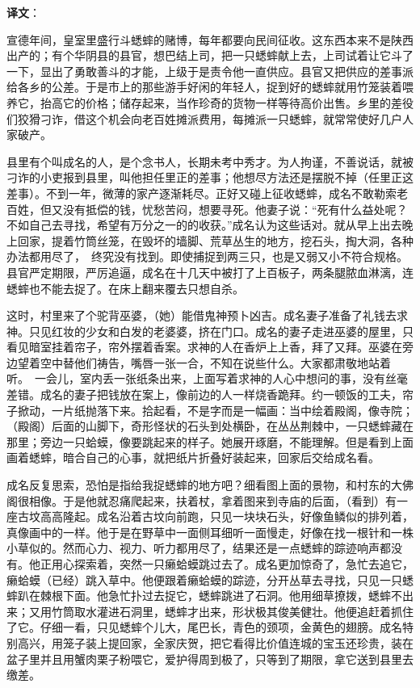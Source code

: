 \documentclass[12pt,UTF-8,openany]{ctexbook}
\begin{document}
\newpage

\textbf{译文}：

\vspace{1em}

\begin{normalsize}
    
    宣德年间，皇室里盛行斗蟋蟀的赌博，每年都要向民间征收。这东西本来不是陕西出产的；有个华阴县的县官，想巴结上司，把一只蟋蟀献上去，上司试着让它斗了一下，显出了勇敢善斗的才能，上级于是责令他一直供应。县官又把供应的差事派给各乡的公差。于是市上的那些游手好闲的年轻人，捉到好的蟋蟀就用竹笼装着喂养它，抬高它的价格；储存起来，当作珍奇的货物一样等待高价出售。乡里的差役们狡猾刁诈，借这个机会向老百姓摊派费用，每摊派一只蟋蟀，就常常使好几户人家破产。
    
    县里有个叫成名的人，是个念书人，长期未考中秀才。为人拘谨，不善说话，就被刁诈的小吏报到县里，叫他担任里正的差事；他想尽方法还是摆脱不掉（任里正这差事）。不到一年，微薄的家产逐渐耗尽。正好又碰上征收蟋蟀，成名不敢勒索老百姓，但又没有抵偿的钱，忧愁苦闷，想要寻死。他妻子说：“死有什么益处呢？不如自己去寻找，希望有万分之一的的收获。”成名认为这些话对。就从早上出去晚上回家，提着竹筒丝笼，在毁坏的墙脚、荒草丛生的地方，挖石头，掏大洞，各种办法都用尽了， 终究没有找到。即使捕捉到两三只，也是又弱又小不符合规格。县官严定期限，严厉追逼，成名在十几天中被打了上百板子，两条腿脓血淋漓，连蟋蟀也不能去捉了。在床上翻来覆去只想自杀。
    
    这时，村里来了个驼背巫婆，（她）能借鬼神预卜凶吉。成名妻子准备了礼钱去求神。只见红妆的少女和白发的老婆婆，挤在门口。成名的妻子走进巫婆的屋里，只看见暗室挂着帘子，帘外摆着香案。求神的人在香炉上上香，拜了又拜。巫婆在旁边望着空中替他们祷告，嘴唇一张一合，不知在说些什么。大家都肃敬地站着听。 一会儿，室内丢一张纸条出来，上面写着求神的人心中想问的事，没有丝毫差错。成名的妻子把钱放在案上，像前边的人一样烧香跪拜。约一顿饭的工夫，帘子掀动，一片纸抛落下来。拾起看，不是字而是一幅画：当中绘着殿阁，像寺院；（殿阁）后面的山脚下，奇形怪状的石头到处横卧，在丛丛荆棘中，一只蟋蟀藏在那里；旁边一只蛤蟆，像要跳起来的样子。她展开琢磨，不能理解。但是看到上面画着蟋蟀，暗合自己的心事，就把纸片折叠好装起来，回家后交给成名看。
    
    成名反复思索，恐怕是指给我捉蟋蟀的地方吧？细看图上面的景物，和村东的大佛阁很相像。于是他就忍痛爬起来，扶着杖，拿着图来到寺庙的后面，（看到）有一座古坟高高隆起。成名沿着古坟向前跑，只见一块块石头，好像鱼鳞似的排列着，真像画中的一样。他于是在野草中一面侧耳细听一面慢走，好像在找一根针和一株小草似的。然而心力、视力、听力都用尽了，结果还是一点蟋蟀的踪迹响声都没有。他正用心探索着，突然一只癞蛤蟆跳过去了。成名更加惊奇了，急忙去追它，癞蛤蟆（已经）跳入草中。他便跟着癞蛤蟆的踪迹，分开丛草去寻找，只见一只蟋蟀趴在棘根下面。他急忙扑过去捉它，蟋蟀跳进了石洞。他用细草撩拨，蟋蟀不出来；又用竹筒取水灌进石洞里，蟋蟀才出来，形状极其俊美健壮。他便追赶着抓住了它。仔细一看，只见蟋蟀个儿大，尾巴长，青色的颈项，金黄色的翅膀。成名特别高兴，用笼子装上提回家，全家庆贺，把它看得比价值连城的宝玉还珍贵，装在盆子里并且用蟹肉栗子粉喂它，爱护得周到极了，只等到了期限，拿它送到县里去缴差。
    

\end{normalsize}
\end{document}
